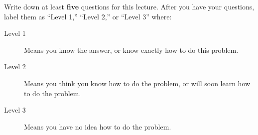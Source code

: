 \documentclass{ximera}
\begin{document}
\begin{xarmaBoost}
  Write down at least \textbf{five} questions for this lecture. After
you have your questions, label them as ``Level 1,'' ``Level 2,'' or ``Level 3'' where:
\begin{description}
\item[Level 1] Means you know the answer, or know exactly how to do
  this problem.
\item[Level 2] Means you think you know how to do the problem, or will
  soon learn how to do the problem.
\item[Level 3] Means you have no idea how to do the problem.
\end{description}
\begin{freeResponse}
\end{freeResponse}
\end{xarmaBoost}
\end{document}

